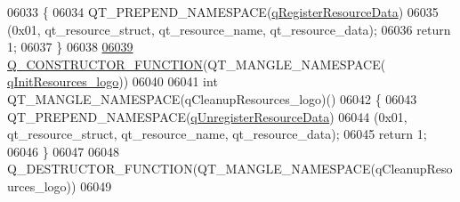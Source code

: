\begin{DoxyCode}
06033 \{
06034     QT\_PREPEND\_NAMESPACE(\hyperlink{a00041_ab3bec3d1e679084be46edc41e4c91bc1}{qRegisterResourceData})
06035         (0x01, qt\_resource\_struct, qt\_resource\_name, qt\_resource\_data);
06036     \textcolor{keywordflow}{return} 1;
06037 \}
06038 
\hypertarget{a00041_source_l06039}{}\hyperlink{a00041_ae1f71e8cee42447be2c10a353b147b74}{06039} \hyperlink{a00041_ae1f71e8cee42447be2c10a353b147b74}{Q\_CONSTRUCTOR\_FUNCTION}(QT\_MANGLE\_NAMESPACE(
      \hyperlink{a00041_a26f25d34489dcef5b740853d8506af1c}{qInitResources\_logo}))
06040 
06041 int QT\_MANGLE\_NAMESPACE(qCleanupResources\_logo)()
06042 \{
06043     QT\_PREPEND\_NAMESPACE(\hyperlink{a00041_ad65f8bca8010dd1fd135a28a085c6d03}{qUnregisterResourceData})
06044        (0x01, qt\_resource\_struct, qt\_resource\_name, qt\_resource\_data);
06045     \textcolor{keywordflow}{return} 1;
06046 \}
06047 
06048 Q\_DESTRUCTOR\_FUNCTION(QT\_MANGLE\_NAMESPACE(qCleanupResources\_logo))
06049 
\end{DoxyCode}
